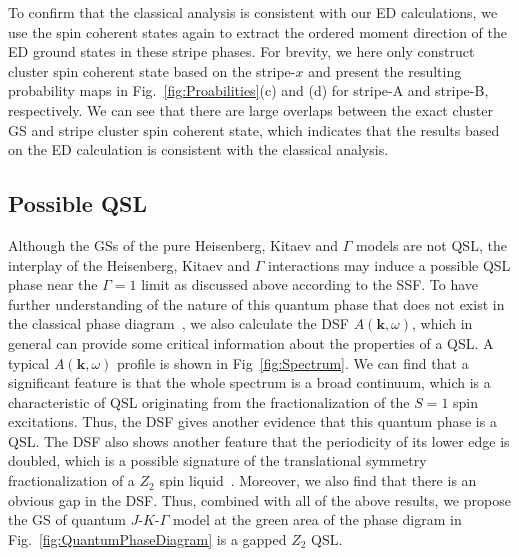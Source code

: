 \documentclass[aps,prb,reprint,amsfonts,amsmath,amssymb,showpacs,groupedaddress,superscriptaddress]{revtex4-1}
\begin{document}
To confirm that the classical analysis is consistent with our ED calculations, we use the spin coherent states again to extract the ordered moment direction of the ED ground states in these stripe phases. For brevity, we here only construct cluster spin coherent state based on the stripe-$x$ and present the resulting probability maps in Fig.~\ref{fig:Proabilities}(c) and (d) for stripe-A and stripe-B, respectively. We can see that there are large overlaps between the exact cluster GS and stripe cluster spin coherent state, which indicates that the results based on the ED calculation is consistent with the classical analysis.

\subsection{\label{subsec:QSL}Possible QSL}

Although the GSs of the pure Heisenberg, Kitaev and $\Gamma$ models are not QSL, the interplay of the Heisenberg, Kitaev and $\Gamma$ interactions may induce a possible QSL phase near the $\Gamma=1$ limit as discussed above according to the SSF. To have further understanding of the nature of this quantum phase that does not exist in the classical phase diagram~\cite{PhysRevB.92.165108}, we also calculate the DSF $A(\mathbf{k}, \omega)$, which in general can provide some critical information about the properties of a QSL. A typical $A(\mathbf{k}, \omega)$ profile is shown in Fig~\ref{fig:Spectrum}. We can find that a significant feature is that the whole spectrum is a broad continuum, which is a characteristic of QSL originating from the fractionalization of the $S=1$ spin excitations. Thus, the DSF gives another evidence that this quantum phase is a QSL. The DSF also shows another feature that the periodicity of its lower edge is doubled, which is a possible signature of the translational symmetry fractionalization of a $Z_{2}$ spin liquid~\cite{PhysRevB.90.121102,mei2015fractionalized,PhysRevB.99.205119}. Moreover, we also find that there is an obvious gap in the DSF. Thus, combined with all of the above results, we propose the GS of quantum $J$-$K$-$\Gamma$ model at the green area of the phase digram in Fig.~\ref{fig:QuantumPhaseDiagram} is a gapped $Z_{2}$ QSL.
\end{document}
